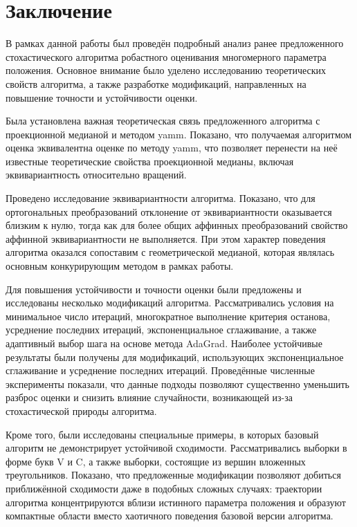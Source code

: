 \chapter{Заключение}

В рамках данной работы был проведён подробный анализ ранее предложенного стохастического алгоритма робастного оценивания многомерного параметра положения. Основное внимание было уделено исследованию теоретических свойств алгоритма, а также разработке модификаций, направленных на повышение точности и устойчивости оценки.

Была установлена важная теоретическая связь предложенного алгоритма с проекционной медианой и методом yamm. Показано, что получаемая алгоритмом оценка эквивалентна оценке по методу yamm, что позволяет перенести на неё известные теоретические свойства проекционной медианы, включая эквивариантность относительно вращений.

Проведено исследование эквивариантности алгоритма. Показано, что для ортогональных преобразований отклонение от эквивариантности оказывается близким к нулю, тогда как для более общих аффинных преобразований свойство аффинной эквивариантности не выполняется. При этом характер поведения алгоритма оказался сопоставим с геометрической медианой, которая являлась основным конкурирующим методом в рамках работы.

Для повышения устойчивости и точности оценки были предложены и исследованы несколько модификаций алгоритма. Рассматривались условия на минимальное число итераций, многократное выполнение критерия останова, усреднение последних итераций, экспоненциальное сглаживание, а также адаптивный выбор шага на основе метода AdaGrad. Наиболее устойчивые результаты были получены для модификаций, использующих экспоненциальное сглаживание и усреднение последних итераций. Проведённые численные эксперименты показали, что данные подходы позволяют существенно уменьшить разброс оценки и снизить влияние случайности, возникающей из-за стохастической природы алгоритма.

Кроме того, были исследованы специальные примеры, в которых базовый алгоритм не демонстрирует устойчивой сходимости. Рассматривались выборки в форме букв V и C, а также выборки, состоящие из вершин вложенных треугольников. Показано, что предложенные модификации позволяют добиться приближённой сходимости даже в подобных сложных случаях: траектории алгоритма концентрируются вблизи истинного параметра положения и образуют компактные области вместо хаотичного поведения базовой версии алгоритма.


